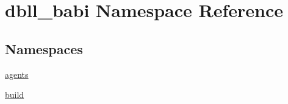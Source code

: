 \hypertarget{namespacedbll__babi}{}\section{dbll\+\_\+babi Namespace Reference}
\label{namespacedbll__babi}
\subsection*{Namespaces}
\begin{DoxyCompactItemize}
\item 
 \hyperlink{namespacedbll__babi_1_1agents}{agents}
\item 
 \hyperlink{namespacedbll__babi_1_1build}{build}
\end{DoxyCompactItemize}
